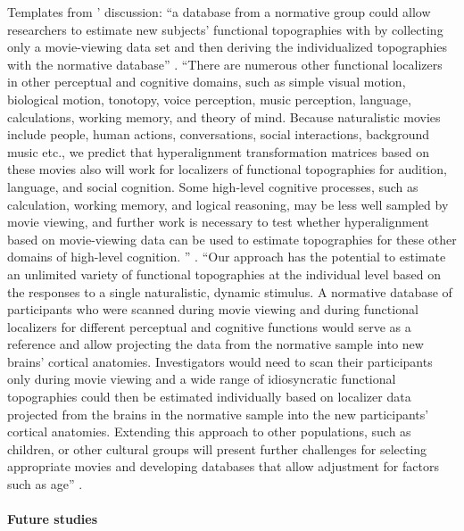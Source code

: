 Templates from \citet{jiahui2020predicting}' discussion:
%
``a database from a normative group could allow researchers to estimate new
subjects' functional topographies with by collecting only a movie-viewing data
set and then deriving the individualized topographies with the normative
database'' \citep{jiahui2020predicting}.
%
``There are numerous other functional localizers in other perceptual and
cognitive domains, such as simple visual motion, biological motion, tonotopy,
voice perception, music perception, language, calculations, working memory, and
theory of mind.
%
Because naturalistic movies include people, human actions, conversations, social
interactions, background music etc., we predict that hyperalignment
transformation matrices based on these movies also will work for localizers of
functional topographies for audition, language, and social cognition.
%
Some high-level cognitive processes, such as calculation, working memory, and
logical reasoning, may be less well sampled by movie viewing, and further work
is necessary to test whether hyperalignment based on movie-viewing data can be
used to estimate topographies for these other domains of high-level cognition.
'' \citep{jiahui2020predicting}.
%
``Our approach has the potential to estimate an unlimited variety of functional
topographies at the individual level based on the responses to a single
naturalistic, dynamic stimulus.
%
A normative database of participants who were scanned during movie viewing and
during functional localizers for different perceptual and cognitive functions
would serve as a reference and allow projecting the data from the normative
sample into new brains' cortical anatomies.
%
Investigators would need to scan their participants only during movie viewing
and a wide range of idiosyncratic functional topographies could then be
estimated individually based on localizer data projected from the brains in the
normative sample into the new participants' cortical anatomies.
%
Extending this approach to other populations, such as children, or other
cultural groups will present further challenges for selecting appropriate movies
and developing databases that allow adjustment for factors such as age''
\citep{jiahui2020predicting}.


\paragraph{Future studies}


